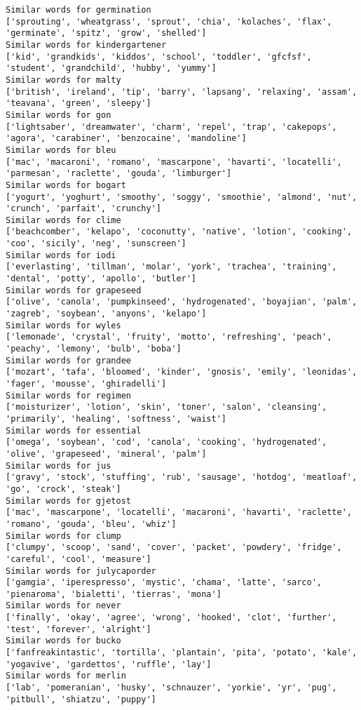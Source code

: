 \documentclass[11pt]{article}
\begin{document}
\begin{Verbatim}[commandchars=\\\{\}]
Similar words for germination
['sprouting', 'wheatgrass', 'sprout', 'chia', 'kolaches', 'flax', 'germinate', 'spitz', 'grow', 'shelled']
Similar words for kindergartener
['kid', 'grandkids', 'kiddos', 'school', 'toddler', 'gfcfsf', 'student', 'grandchild', 'hubby', 'yummy']
Similar words for malty
['british', 'ireland', 'tip', 'barry', 'lapsang', 'relaxing', 'assam', 'teavana', 'green', 'sleepy']
Similar words for gon
['lightsaber', 'dreamwater', 'charm', 'repel', 'trap', 'cakepops', 'agora', 'carabiner', 'benzocaine', 'mandoline']
Similar words for bleu
['mac', 'macaroni', 'romano', 'mascarpone', 'havarti', 'locatelli', 'parmesan', 'raclette', 'gouda', 'limburger']
Similar words for bogart
['yogurt', 'yoghurt', 'smoothy', 'soggy', 'smoothie', 'almond', 'nut', 'crunch', 'parfait', 'crunchy']
Similar words for clime
['beachcomber', 'kelapo', 'coconutty', 'native', 'lotion', 'cooking', 'coo', 'sicily', 'neg', 'sunscreen']
Similar words for iodi
['everlasting', 'tillman', 'molar', 'york', 'trachea', 'training', 'dental', 'potty', 'apollo', 'butler']
Similar words for grapeseed
['olive', 'canola', 'pumpkinseed', 'hydrogenated', 'boyajian', 'palm', 'zagreb', 'soybean', 'anyons', 'kelapo']
Similar words for wyles
['lemonade', 'crystal', 'fruity', 'motto', 'refreshing', 'peach', 'peachy', 'lemony', 'bulb', 'boba']
Similar words for grandee
['mozart', 'tafa', 'bloomed', 'kinder', 'gnosis', 'emily', 'leonidas', 'fager', 'mousse', 'ghiradelli']
Similar words for regimen
['moisturizer', 'lotion', 'skin', 'toner', 'salon', 'cleansing', 'primarily', 'healing', 'softness', 'waist']
Similar words for essential
['omega', 'soybean', 'cod', 'canola', 'cooking', 'hydrogenated', 'olive', 'grapeseed', 'mineral', 'palm']
Similar words for jus
['gravy', 'stock', 'stuffing', 'rub', 'sausage', 'hotdog', 'meatloaf', 'go', 'crock', 'steak']
Similar words for gjetost
['mac', 'mascarpone', 'locatelli', 'macaroni', 'havarti', 'raclette', 'romano', 'gouda', 'bleu', 'whiz']
Similar words for clump
['clumpy', 'scoop', 'sand', 'cover', 'packet', 'powdery', 'fridge', 'careful', 'cool', 'measure']
Similar words for julycaporder
['gamgia', 'iperespresso', 'mystic', 'chama', 'latte', 'sarco', 'pienaroma', 'bialetti', 'tierras', 'mona']
Similar words for never
['finally', 'okay', 'agree', 'wrong', 'hooked', 'clot', 'further', 'test', 'forever', 'alright']
Similar words for bucko
['fanfreakintastic', 'tortilla', 'plantain', 'pita', 'potato', 'kale', 'yogavive', 'gardettos', 'ruffle', 'lay']
Similar words for merlin
['lab', 'pomeranian', 'husky', 'schnauzer', 'yorkie', 'yr', 'pug', 'pitbull', 'shiatzu', 'puppy']

\end{Verbatim}
\end{document}
